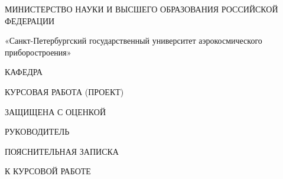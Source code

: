 

\thispagestyle{empty}

\begingroup
\fontsize{12}{14.4}\selectfont


\begin{center}
МИНИСТЕРСТВО НАУКИ И ВЫСШЕГО ОБРАЗОВАНИЯ РОССИЙСКОЙ ФЕДЕРАЦИИ
	
\vspace{0.5ex}
	
	
«Санкт-Петербургский государственный университет аэрокосмического приборостроения»
	
\vspace{0.9cm}
	
КАФЕДРА \MakeUppercase{\setUniversityDepartment}
\end{center} 

\vspace{1.2cm}

\begin{flushleft}
КУРСОВАЯ РАБОТА (ПРОЕКТ) 

ЗАЩИЩЕНА С ОЦЕНКОЙ

РУКОВОДИТЕЛЬ
\end{flushleft}

\noindent {}

\vspace{1.2cm}

\begin{center}
{\fontsize{14}{18}\selectfont
ПОЯСНИТЕЛЬНАЯ ЗАПИСКА

К КУРСОВОЙ РАБОТЕ
}
	
\vspace{12mm}
	
{\fontsize{14}{18}\selectfont \MakeUppercase{\setWorkName}}
\end{center}

